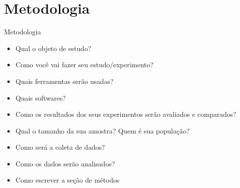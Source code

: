 \section{Metodologia}

\begin{frame}	
	\begin{block}{Metodologia}
		 \begin{itemize}
			  \item Qual o objeto de estudo?
			  \item Como você vai fazer seu estudo/experimento?
			  \item Quais ferramentas serão usadas?
			  \item Quais softwares?
			  \item Como os resultados dos seus experimentos serão avaliados e comparados?
			  \item Qual o tamanho da sua amostra? Quem é sua população?
			  \item Como será a coleta de dados?
		      \item Como os dados serão analisados?
		      \item Como escrever a seção de métodos \href{http://posgraduando.com/como-escrever-material-e-metodos/}{\color{blue}{Métodos}} 
		  \end{itemize}
	\end{block}
\end{frame}
